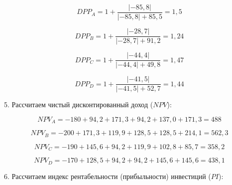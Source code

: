 \[ DPP_A =  1 + \dfrac{|-85,8|}{|-85,8| + 85,5} = 1,5\]

\[ DPP_B =  1 + \dfrac{|-28,7|}{|-28,7| + 91,2} = 1,24\]

\[ DPP_C =  1 + \dfrac{|-44,4|}{|-44,4| + 49,8} = 1,47 \]

\[ DPP_D = 1+ \dfrac{|-41,5|}{|-41,5| + 52,7} = 1,44 \]

5. Рассчитаем чистый дисконтированный доход ($NPV$):

\[ NPV_A =  -180 + 94,2  +171,3 + 94,2  + 137,0 + 171,3  = 488\]

\[ NPV_B =-200 +171,3 + 119,9 + 128,5 + 128,5 + 214,1 =562,3\]

\[ NPV_C =  -190+145,6+94,2+119,9+102,8+85,7=358,2\]

\[ NPV_D = -170+128,5+94,2+94,2+145,6+145,6=438,1\]

6. Рассчитаем индекс рентабельности (прибыльности) инвестиций ($PI$):




\begin{table}[]
		\label{final}
	\caption{Показатели эффективности инвестиционных проектов}
	\small
\end{table}

